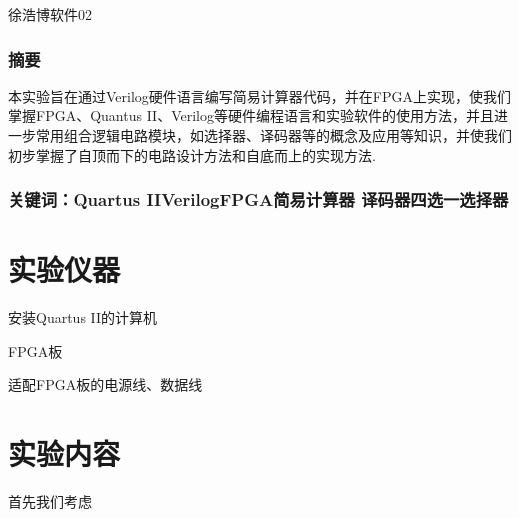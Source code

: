 \documentclass[UTF8]{ctexart}
\begin{document}
\renewcommand{\thefootnote}{\fnsymbol{footnote}}
\linespread{1.4}
\title{\vspace{-5em}\vspace{-2.5em}}
\date{}
\maketitle
\begin{center}
{\fangsong 徐浩博\quad 软件02}
\end{center}

\subsubsection*{摘要}
{\kaishu\normalsize  本实验旨在通过Verilog硬件语言编写简易计算器代码，并在FPGA上实现，使我们掌握FPGA、Quantus II、Verilog等硬件编程语言和实验软件的使用方法，并且进一步常用组合逻辑电路模块，如选择器、译码器等的概念及应用等知识，并使我们初步掌握了自顶而下的电路设计方法和自底而上的实现方法.}
\subsubsection*{关键词：Quartus II\quad Verilog\quad FPGA\quad 简易计算器 \quad 译码器\quad 四选一选择器\vspace{1.5em}}
\songti

\section{实验仪器}
安装Quartus II的计算机\par
FPGA板\par
适配FPGA板的电源线、数据线
\par

\section{实验内容}
首先我们考虑
\end{document}
